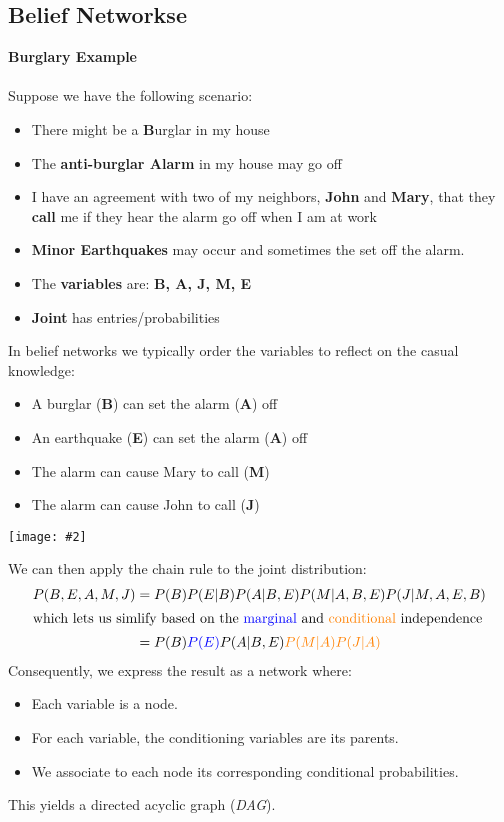 \documentclass{article}
\def\blu#1{{\color{blu}#1}}
\newcommand{\centerfig}[2]{\begin{center}\texttt{[image: \#2]}\end{center}}
\begin{document}
\subsection*{Belief Networkse}
\begin{siderules}
\textbf{Burglary Example}\\
\\

Suppose we have the following scenario:
\begin{itemize}
	\item There might be a \textbf{\blu{B}}urglar in my house
	\item The \textbf{anti-burglar \blu{A}larm} in my house may go off
	\item I have an agreement with two of my neighbors, \textbf{\blu{J}ohn} and \textbf{\blu{M}ary}, that they \textbf{call} me if they hear the alarm go off when I am at work
	\item \textbf{Minor \blu{E}arthquakes} may occur and sometimes the set off the alarm.
	\item The \textbf{variables} are: \textbf{\blu{B, A, J, M, E}}
	\item \textbf{Joint} has entries/probabilities
\end{itemize}
In belief networks we typically order the variables to reflect on the casual knowledge:
\begin{itemize}
	\item A burglar (\textbf{\blu{B}}) can set the alarm (\textbf{\blu{A}}) off
	\item An earthquake (\textbf{\blu{E}}) can set the alarm (\textbf{\blu{A}}) off
	\item The alarm can cause Mary to call (\textbf{\blu{M}})
	\item The alarm can cause John to call (\textbf{\blu{J}})
\end{itemize}
\centerfig{0.3}{BN-1}
We can then apply the chain rule to the joint distribution:
\begin{align*}
	P(B, E, A, M, J) &= P(B)P(E|B)P(A|B,E)P(M|A, B ,E)P(J|M, A, E, B) \\
	\intertext{which lets us simlify based on the \blu{marginal} and {\color{orange} conditional} independence} 
	&= P(B)\blu{P(E)}P(A|B,E){\color{orange}P(M|A)P(J|A)}
\end{align*}
Consequently, we express the result as a network where:
\begin{itemize}
	\item Each variable is a node.
	\item For each variable, the conditioning variables are its parents.
	\item We associate to each node its corresponding conditional probabilities.
\end{itemize}
This yields a directed acyclic graph (\textit{DAG}). 
\end{siderules}
\end{document}
